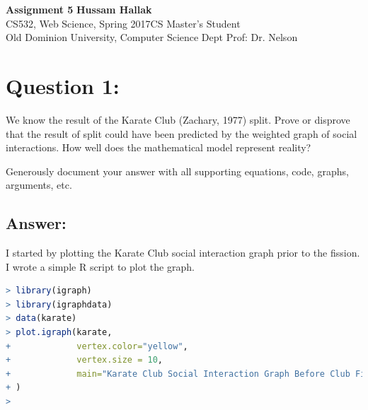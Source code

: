 \documentclass[a4paper, 11pt]{article}
\begin{document}
\noindent
\large\textbf{Assignment 5} \hfill \textbf{Hussam Hallak} \\
\normalsize CS532, Web Science, Spring 2017\hfill CS Master's Student \\
Old Dominion University, Computer Science Dept \hfill Prof: Dr. Nelson 

\section*{Question 1:}
We know the result of the Karate Club (Zachary, 1977) split.
Prove or disprove that the result of split could have been predicted
by the weighted graph of social interactions.  How well does the
mathematical model represent reality?

Generously document your answer with all supporting equations, code,
graphs, arguments, etc.

\subsection*{Answer:}
I started by plotting the Karate Club social interaction graph prior to the fission. I wrote a simple R script to plot the graph.

\begin{lstlisting}[language=R, breakatwhitespace=〈false), label=Karate Club Social Interaction Graph Before Club Fission in R, caption= Karate Club Social Interaction Graph Before Club Fission in R]
> library(igraph)
> library(igraphdata)
> data(karate)
> plot.igraph(karate, 
+             vertex.color="yellow",
+             vertex.size = 10,
+             main="Karate Club Social Interaction Graph Before Club Fission"
+ )
>
\end{lstlisting}
\end{document}
